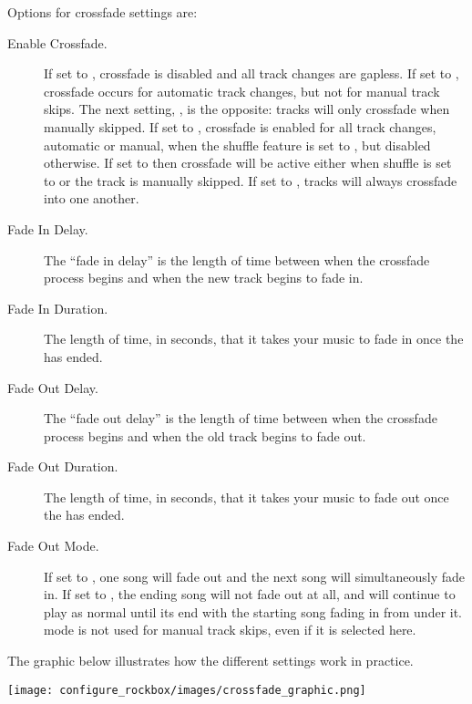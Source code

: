 {  Options for crossfade settings are:
  \begin{description}
    \item[Enable Crossfade.] If set to , crossfade is disabled
      and all track changes are gapless.  If set to
      , crossfade occurs for automatic
      track changes, but not for manual track skips.  The next setting,
      , is the opposite: tracks will only
      crossfade when manually skipped.  If set to , crossfade
      is enabled for all track changes, automatic or manual, when the shuffle
      feature is set to , but disabled otherwise.  If set to
       then crossfade will be active
      either when shuffle is set to  or the track is manually
      skipped.  If set to , tracks will always crossfade into
      one another.
    \item[Fade In Delay.] The ``fade in delay'' is the length of time between
      when the crossfade process begins and when the new track begins to fade
      in.
    \item[Fade In Duration.] The length of time, in seconds, that it takes
      your music to fade in once the  has ended.
    \item[Fade Out Delay.] The ``fade out delay'' is the length of time
      between when the crossfade process begins and when the old track begins
      to fade out.
    \item[Fade Out Duration.] The length of time, in seconds, that it takes
      your music to fade out once the  has ended.
    \item[Fade Out Mode.] If set to , one song will fade
      out and the next song will simultaneously fade in. If set to 
      , the ending song will not fade out at all, and will
      continue to play as normal until its end with the starting song fading
      in from under it.  mode is not used for manual track skips,
      even if it is selected here.
    \end{description}
      

        The graphic below illustrates how the different settings work in practice.

       \texttt{[image: configure\_rockbox/images/crossfade\_graphic.png]}
  }%
    
